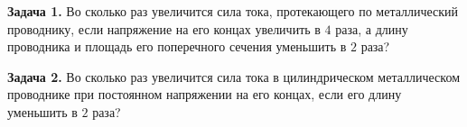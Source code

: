
\begin{taskbasic}[code={\label{task:elem_ohm_v1_n11}}]
\textbf{Задача 1.} Во сколько раз увеличится сила тока, протекающего по металлический проводнику, если напряжение на его концах увеличить в $4$ раза, а длину проводника и площадь его поперечного сечения уменьшить в $2$ раза?

\end{taskbasic}

\begin{taskbasic}[code={\label{task:elem_ohm_v2_n11}}]
\textbf{Задача 2.} Во сколько раз увеличится сила тока в цилиндрическом металлическом проводнике при постоянном напряжении на его концах, если его длину уменьшить в $2$ раза?

\end{taskbasic}

